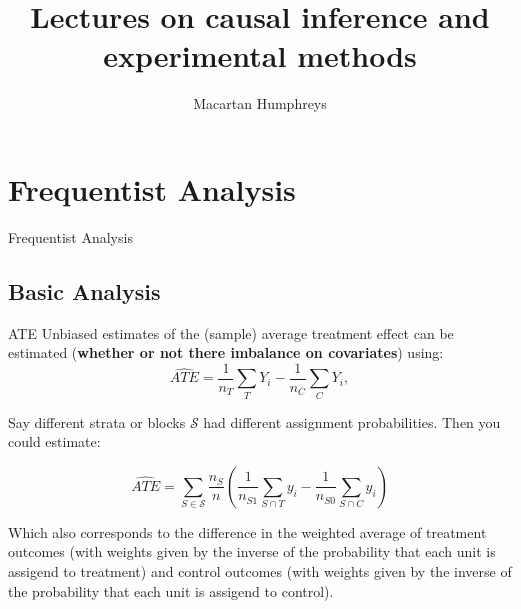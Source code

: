 \documentclass[
  11pt,
  ignorenonframetext,
]{beamer}
\title{Lectures on causal inference and experimental methods}
\author{Macartan Humphreys}
\date{}
\begin{document}
\frame{\titlepage}
\ifdefined\Shaded\renewenvironment{Shaded}{\begin{tcolorbox}[borderline west={3pt}{0pt}{shadecolor}, frame hidden, interior hidden, boxrule=0pt, sharp corners, enhanced, breakable]}{\end{tcolorbox}}\fi

\hypertarget{frequentist-analysis}{%
\section{\texorpdfstring{Frequentist Analysis
\label{L_inference}}{Frequentist Analysis }}\label{frequentist-analysis}}

\begin{frame}{Frequentist Analysis \label{L_inference}}
\hyperlink{ideas}{}
\end{frame}

\hypertarget{basic-analysis}{%
\subsection{\texorpdfstring{Basic Analysis
\label{nools}}{Basic Analysis }}\label{basic-analysis}}

\begin{frame}{ATE}
\protect\hypertarget{ate}{}
Unbiased estimates of the (sample) average treatment effect can be
estimated (\textbf{whether or not there imbalance on covariates}) using:
\[
\widehat{ATE} = \frac{1}{n_T}\sum_TY_i - \frac{1}{n_C}\sum_CY_i,
\]

Say different strata or blocks \(\mathcal{S}\) had different assignment
probabilities. Then you could estimate:

\begin{equation} \widehat{ATE} = \sum_{S\in \mathcal{S}}\frac{n_{S}}{n} \left(\frac{1}{n_{S1}}\sum_{S\cap T}y_i - \frac{1}{n_{S0}}\sum_{S\cap C}y_i \right) \end{equation}

Which also corresponds to the difference in the weighted average of
treatment outcomes (with weights given by the inverse of the probability
that each unit is assigend to treatment) and control outcomes (with
weights given by the inverse of the probability that each unit is
assigend to control).
\end{frame}
\end{document}
